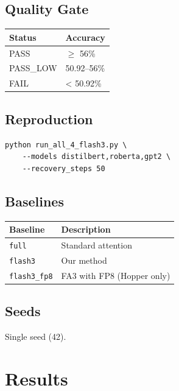 \subsection{Quality Gate}

\begin{table}[H]
\centering
\small
\begin{tabular}{ll}
\toprule
\textbf{Status} & \textbf{Accuracy} \\
\midrule
PASS & $\ge$ 56\% \\
PASS\_LOW & 50.92--56\% \\
FAIL & < 50.92\% \\
\bottomrule
\end{tabular}
\end{table}

\subsection{Reproduction}

\begin{lstlisting}
python run_all_4_flash3.py \
    --models distilbert,roberta,gpt2 \
    --recovery_steps 50
\end{lstlisting}

\subsection{Baselines}

\begin{table}[H]
\centering
\small
\begin{tabular}{ll}
\toprule
\textbf{Baseline} & \textbf{Description} \\
\midrule
\texttt{full} & Standard attention \\
\texttt{flash3} & Our method \\
\texttt{flash3\_fp8} & FA3 with FP8 (Hopper only) \\
\bottomrule
\end{tabular}
\end{table}

\subsection{Seeds}

Single seed (42).



\section{Results}

